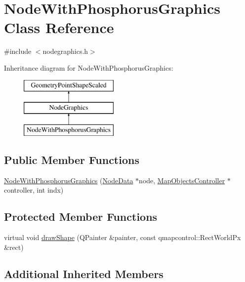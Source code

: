 \hypertarget{class_node_with_phosphorus_graphics}{}\section{Node\+With\+Phosphorus\+Graphics Class Reference}
\label{class_node_with_phosphorus_graphics}


{\ttfamily \#include $<$nodegraphics.\+h$>$}

Inheritance diagram for Node\+With\+Phosphorus\+Graphics\+:\begin{figure}[H]
\begin{center}
\leavevmode
\includegraphics[height=3.000000cm]{d2/dc0/class_node_with_phosphorus_graphics}
\end{center}
\end{figure}
\subsection*{Public Member Functions}
\begin{DoxyCompactItemize}
\item 
\mbox{\hyperlink{class_node_with_phosphorus_graphics_a81cef25a3d6f539e1de8b31d6b454815}{Node\+With\+Phosphorus\+Graphics}} (\mbox{\hyperlink{class_node_data}{Node\+Data}} $\ast$node, \mbox{\hyperlink{class_map_objects_controller}{Map\+Objects\+Controller}} $\ast$controller, int indx)
\end{DoxyCompactItemize}
\subsection*{Protected Member Functions}
\begin{DoxyCompactItemize}
\item 
virtual void \mbox{\hyperlink{class_node_with_phosphorus_graphics_abcdf09ab3438c22ffdb87a629be97a0d}{draw\+Shape}} (Q\+Painter \&painter, const qmapcontrol\+::\+Rect\+World\+Px \&rect)
\end{DoxyCompactItemize}
\subsection*{Additional Inherited Members}


